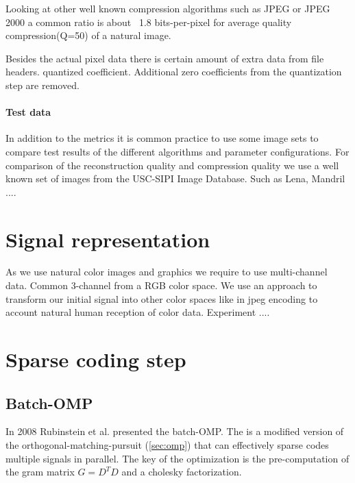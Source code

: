 Looking at other well known compression algorithms such as JPEG or JPEG 2000
a common ratio is about ~1.8 bits-per-pixel for average quality
compression(Q=50) of a natural image. 

Besides the actual pixel data there is certain amount of extra data from file
headers. 
quantized coefficient. Additional zero coefficients from the quantization step
are removed.

\paragraph{Test data}
In addition to the metrics it is common practice to use some image sets to
compare test results of the different algorithms and parameter configurations.
For comparison of the reconstruction quality and compression quality we use a
well known set of images from the USC-SIPI Image Database. Such as Lena, Mandril
....

\section{Signal representation}
\label{sec:signal_representation}
As we use natural color images and graphics we require to use multi-channel
data. Common 3-channel from a RGB color space. %
We use an approach to transform our initial signal into other color spaces like
in jpeg encoding to account natural human reception of color data. Experiment
....


\section{Sparse coding step}
\subsection{Batch-OMP}
In 2008 Rubinstein et al.\cite{Rubinstein2008} presented the batch-OMP. The
 is a modified version of the
orthogonal-matching-pursuit (\ref{sec:omp}) that can effectively sparse codes
multiple signals in parallel. The key of the optimization is the pre-computation
of the gram matrix $G=D^TD$ and a cholesky factorization.

